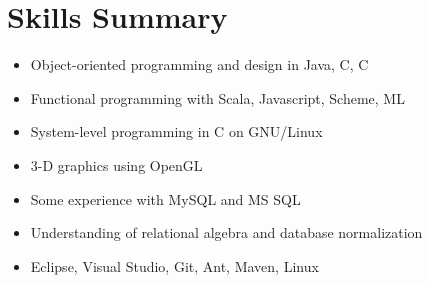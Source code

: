 \documentclass[12pt,letterpaper,sans]{moderncv}
\newcommand{\cpp}
    {C\nolinebreak\hspace{-0.05em}\raisebox{0.4ex}{\textbf{\scriptsize+}}\nolinebreak\hspace{-0.10em}\raisebox{0.4ex}{\textbf{\scriptsize+}}}
\newcommand{\csharp}
    {C\nolinebreak\hspace{-.05em}\raisebox{0.4ex}{\small\#}}
\begin{document}
\section{Skills Summary}
    {\begin{itemize}
        \item Object-oriented programming and design in Java, \csharp, \cpp
        \item Functional programming with Scala, Javascript, Scheme, ML
        \item System-level programming in C on GNU/Linux
        \item 3-D graphics using OpenGL
    \end{itemize}}\vspace*{-\baselineskip}
    {\begin{itemize}
        \item Some experience with MySQL and MS SQL 
        \item Understanding of relational algebra and database normalization
    \end{itemize}}\vspace*{-\baselineskip}
    {\begin{itemize}
        \item Eclipse, Visual Studio, Git, Ant, Maven, Linux
    \end{itemize}}\vspace*{-\baselineskip}
\end{document}
